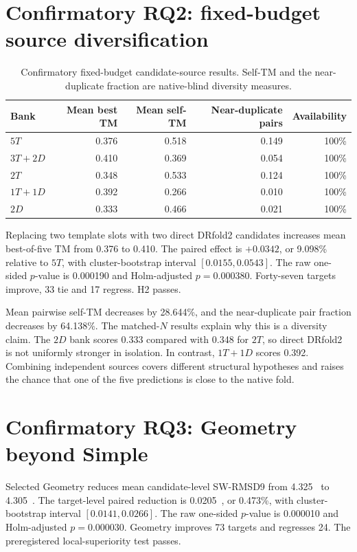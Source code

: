 \documentclass[12pt,a4paper,oneside]{report}
\newcommand{\angstrom}{\text{\AA}}
\begin{document}
\section{Confirmatory RQ2: fixed-budget source diversification}

\begin{table}[H]
\centering
\caption{Confirmatory fixed-budget candidate-source results. Self-TM and the
near-duplicate fraction are native-blind diversity measures.}
\begin{tabularx}{\textwidth}{Xrrrr}
\toprule
Bank & Mean best TM & Mean self-TM & Near-duplicate pairs & Availability \\
\midrule
$5T$ & 0.376 & 0.518 & 0.149 & 100\% \\
$3T+2D$ & 0.410 & 0.369 & 0.054 & 100\% \\
$2T$ & 0.348 & 0.533 & 0.124 & 100\% \\
$1T+1D$ & 0.392 & 0.266 & 0.010 & 100\% \\
$2D$ & 0.333 & 0.466 & 0.021 & 100\% \\
\bottomrule
\end{tabularx}
\end{table}

Replacing two template slots with two direct DRfold2 candidates increases mean
best-of-five TM from 0.376 to 0.410. The paired effect is $+0.0342$, or 9.098\%
relative to $5T$, with cluster-bootstrap interval $[0.0155,0.0543]$. The raw
one-sided $p$-value is 0.000190 and Holm-adjusted $p=0.000380$. Forty-seven targets
improve, 33 tie and 17 regress. H2 passes.

Mean pairwise self-TM decreases by 28.644\%, and the near-duplicate pair fraction
decreases by 64.138\%. The matched-$N$ results explain why this is a diversity claim.
The $2D$ bank scores 0.333 compared with 0.348 for $2T$, so direct DRfold2 is not
uniformly stronger in isolation. In contrast, $1T+1D$ scores 0.392. Combining
independent sources covers different structural hypotheses and raises the chance that
one of the five predictions is close to the native fold.

\section{Confirmatory RQ3: Geometry beyond Simple}

Selected Geometry reduces mean candidate-level SW-RMSD9 from 4.325~\angstrom{} to
4.305~\angstrom{}. The target-level paired reduction is 0.0205~\angstrom{}, or
0.473\%, with cluster-bootstrap interval $[0.0141,0.0266]$. The raw one-sided
$p$-value is 0.000010 and Holm-adjusted $p=0.000030$. Geometry improves 73 targets
and regresses 24. The preregistered local-superiority test passes.
\end{document}
